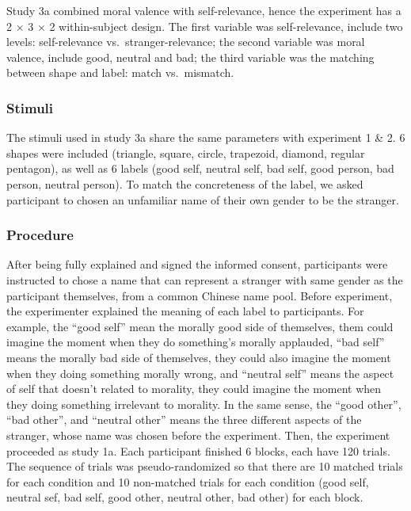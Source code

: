 \documentclass[
  english,
  man]{apa6}
\begin{document}
Study 3a combined moral valence with self-relevance, hence the experiment has a 2 × 3 × 2 within-subject design. The first variable was self-relevance, include two levels: self-relevance vs.~stranger-relevance; the second variable was moral valence, include good, neutral and bad; the third variable was the matching between shape and label: match vs.~mismatch.

\hypertarget{stimuli}{%
\subsubsection{Stimuli}\label{stimuli}}

The stimuli used in study 3a share the same parameters with experiment 1 \& 2. 6 shapes were included (triangle, square, circle, trapezoid, diamond, regular pentagon), as well as 6 labels (good self, neutral self, bad self, good person, bad person, neutral person). To match the concreteness of the label, we asked participant to chosen an unfamiliar name of their own gender to be the stranger.

\hypertarget{procedure-4}{%
\subsubsection{Procedure}\label{procedure-4}}

After being fully explained and signed the informed consent, participants were instructed to chose a name that can represent a stranger with same gender as the participant themselves, from a common Chinese name pool. Before experiment, the experimenter explained the meaning of each label to participants. For example, the \enquote{good self} mean the morally good side of themselves, them could imagine the moment when they do something's morally applauded, \enquote{bad self} means the morally bad side of themselves, they could also imagine the moment when they doing something morally wrong, and \enquote{neutral self} means the aspect of self that doesn't related to morality, they could imagine the moment when they doing something irrelevant to morality. In the same sense, the \enquote{good other}, \enquote{bad other}, and \enquote{neutral other} means the three different aspects of the stranger, whose name was chosen before the experiment. Then, the experiment proceeded as study 1a. Each participant finished 6 blocks, each have 120 trials. The sequence of trials was pseudo-randomized so that there are 10 matched trials for each condition and 10 non-matched trials for each condition (good self, neutral sef, bad self, good other, neutral other, bad other) for each block.
\end{document}
